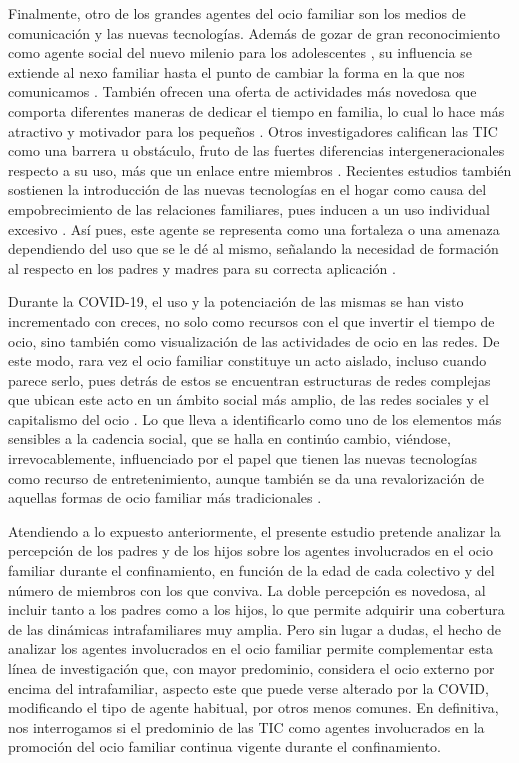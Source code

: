 \documentclass[spanish]{textolivre}
\begin{document}
Finalmente, otro de los grandes agentes del ocio familiar son los medios de comunicación y las nuevas tecnologías. Además de gozar de gran reconocimiento como agente social del nuevo milenio para los adolescentes \cite{gomes2014}, su influencia se extiende al nexo familiar hasta el punto de cambiar la forma en la que nos comunicamos \cite{orchard2010}. También ofrecen una oferta de actividades más novedosa que comporta diferentes maneras de dedicar el tiempo en familia, lo cual lo hace más atractivo y motivador para los pequeños \cite{godfrey2009}. Otros investigadores califican las TIC como una barrera u obstáculo, fruto de las fuertes diferencias intergeneracionales respecto a su uso, más que un enlace entre miembros \cite{fernandezmontalvo2015}. Recientes estudios también sostienen la introducción de las nuevas tecnologías en el hogar como causa del empobrecimiento de las relaciones familiares, pues inducen a un uso individual excesivo \cite{carvalho2015}. Así pues, este agente se representa como una fortaleza o una amenaza dependiendo del uso que se le dé al mismo, señalando la necesidad de formación al respecto en los padres y madres para su correcta aplicación \cite{wang2015}. 

Durante la COVID-19, el uso y la potenciación de las mismas se han visto incrementado con creces, no solo como recursos con el que invertir el tiempo de ocio, sino también como visualización de las actividades de ocio en las redes. De este modo, rara vez el ocio familiar constituye un acto aislado, incluso cuando parece serlo, pues detrás de estos se encuentran estructuras de redes complejas que ubican este acto en un ámbito social más amplio, de las redes sociales y el capitalismo del ocio \cite{bond2020}. Lo que lleva a identificarlo como uno de los elementos más sensibles a la cadencia social, que se halla en continúo cambio, viéndose, irrevocablemente, influenciado por el papel que tienen las nuevas tecnologías como recurso de entretenimiento, aunque también se da una revalorización de aquellas formas de ocio familiar más tradicionales \cite{vanleeuwen2020}. 

Atendiendo a lo expuesto anteriormente, el presente estudio pretende analizar la percepción de los padres y de los hijos sobre los agentes involucrados en el ocio familiar durante el confinamiento, en función de la edad de cada colectivo y del número de miembros con los que conviva. La doble percepción es novedosa, al incluir tanto a los padres como a los hijos, lo que permite adquirir una cobertura de las dinámicas intrafamiliares muy amplia. Pero sin lugar a dudas, el hecho de analizar los agentes involucrados en el ocio familiar permite complementar esta línea de investigación que, con mayor predominio, considera el ocio externo por encima del intrafamiliar, aspecto este que puede verse alterado por la COVID, modificando el tipo de agente habitual, por otros menos comunes. En definitiva, nos interrogamos si el predominio de las TIC como agentes involucrados en la promoción del ocio familiar continua vigente durante el confinamiento.
\end{document}
